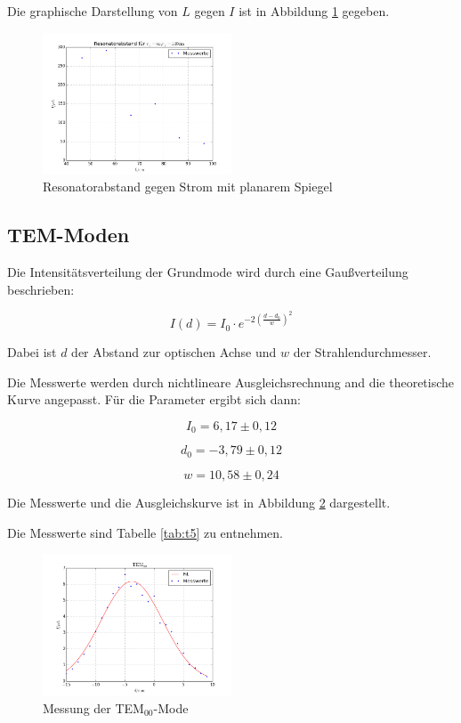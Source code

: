 \noindent Die graphische Darstellung von \(L\) gegen \(I\) ist in Abbildung \ref{fig:stabil2} gegeben.

\begin{figure}
	\centering
		\includegraphics[width=0.5\textwidth]{plots/stabil2}
	\caption{Resonatorabstand gegen Strom mit planarem Spiegel}
	\label{fig:stabil2}
\end{figure}

\subsection{TEM-Moden}
Die Intensitätsverteilung der Grundmode wird durch eine Gaußverteilung beschrieben:

\begin{equation}
I(d)=I_0\cdot e^{-2\left(\frac{d-d_0}{w}\right)^2}
\end{equation}

\noindent Dabei ist \(d\) der Abstand zur optischen Achse und \(w\) der Strahlendurchmesser.

\noindent Die Messwerte werden durch nichtlineare Ausgleichsrechnung and die theoretische Kurve angepasst. Für die Parameter ergibt sich dann:


\begin{equation*}
I_0=6,17\pm0,12
\end{equation*}

\begin{equation*}
d_0=-3,79\pm0,12
\end{equation*}

\begin{equation*}
w=10,58\pm0,24
\end{equation*}

\noindent Die Messwerte und die Ausgleichskurve ist in Abbildung \ref{fig:TEM00} dargestellt.

\noindent Die Messwerte sind Tabelle \ref{tab:t5} zu entnehmen.

\begin{figure}
	\centering
	\includegraphics[width=0.5\textwidth]{plots/TEM00}
	\caption{Messung der TEM\(_{00}\)-Mode}
	\label{fig:TEM00}
\end{figure}

